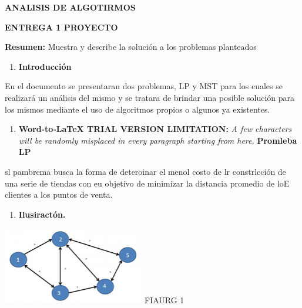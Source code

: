 \documentclass[10pt]{article}
\author{usuario}
\title{}
\begin{document}
\begin{center}
\textbf{{\huge ANALISIS DE ALGOTIRMOS}}
\end{center}

\begin{center}
\textbf{{\huge ENTREGA 1 PROYECTO}}
\end{center}

\begin{center}
\end{center}

\textbf{Resumen:} Muestra y describe la soluci\'{o}n a los problemas planteados
\textbf{ }
\begin{multicols}{2}

\begin{enumerate}
	\item \textbf{Introducci\'{o}n}
\end{enumerate}

En el documento se presentaran dos problemas, LP  y MST para los cuales se
realizar\'{a} un an\'{a}lisis del mismo y se tratara de brindar una posible
soluci\'{o}n para los mismos mediante el uso de algoritmos propios o algunos ya
existentes.

\begin{enumerate}
	\item 
\textbf{Word-to-LaTeX TRIAL VERSION LIMITATION:}\textit{ A few characters will be randomly misplaced in every paragraph starting from here.}
\textbf{Promleba LP}
\end{enumerate}

sl  pambrema busca la forma de deteroinar el menol costo de lr constrlcci\'{o}n
de una serie de tiendas con eu objetivo de minimizar la distancia promedio de loE
clientes a los puntos de venta.

\begin{enumerate}
	\item \textbf{Ilusiract\'{o}n.}
\end{enumerate}
\includegraphics[width=175pt]{img-1.png}{\large  }
\hspace{15pt}\hspace{15pt}FIAURG 1


\end{multicols}
\end{document}

